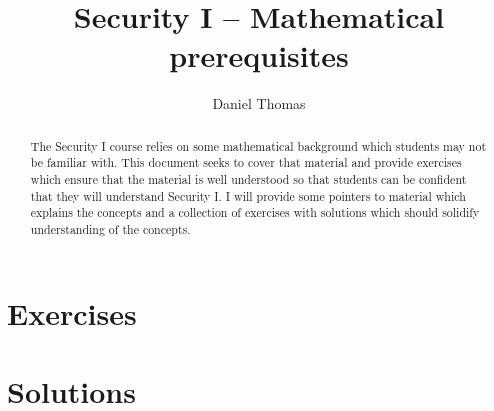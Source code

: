 \documentclass[12pt,a4paper]{article}
\author{Daniel Thomas}
\title{Security I -- Mathematical prerequisites}
\newif\ifshowanswers
\begin{document}
\maketitle

\begin{abstract}
The Security I course relies on some mathematical background which students may not be familiar with.
This document seeks to cover that material and provide exercises which ensure that the material is well understood so that students can be confident that they will understand Security I.
I will provide some pointers to material which explains the concepts and a collection of exercises with solutions which should solidify understanding of the concepts.
\end{abstract}

\section{Exercises}
\showanswersfalse



\section{Solutions}
\showanswerstrue

\end{document}
